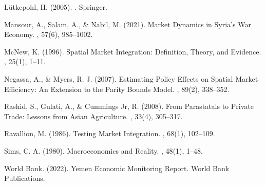 \begin{thebibliography}{99}
Lütkepohl, H. (2005).
.
\newblock Springer.

Mansour, A., Salam, A., \& Nabil, M. (2021).
\newblock Market Dynamics in Syria's War Economy.
, 57(6), 985--1002.

McNew, K. (1996).
\newblock Spatial Market Integration: Definition, Theory, and Evidence.
, 25(1), 1--11.

Negassa, A., \& Myers, R. J. (2007).
\newblock Estimating Policy Effects on Spatial Market Efficiency: An Extension to the Parity Bounds Model.
, 89(2), 338--352.

Rashid, S., Gulati, A., \& Cummings Jr, R. (2008).
\newblock From Parastatals to Private Trade: Lessons from Asian Agriculture.
, 33(4), 305--317.

Ravallion, M. (1986).
\newblock Testing Market Integration.
, 68(1), 102--109.

Sims, C. A. (1980).
\newblock Macroeconomics and Reality.
, 48(1), 1--48.

World Bank. (2022).
\newblock Yemen Economic Monitoring Report.
\newblock World Bank Publications.

\end{thebibliography}
